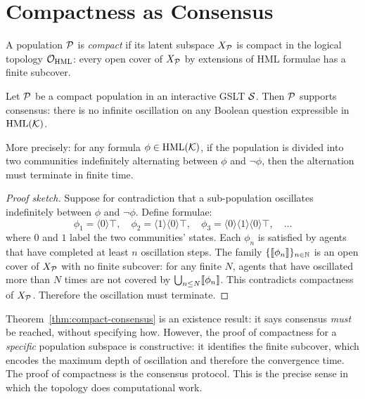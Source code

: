 \section{Compactness as Consensus}

\begin{definition}
A population $\mathcal{P}$ is \emph{compact} if its latent subspace
$X_{\mathcal{P}}$ is compact in the logical topology $\mathcal{O}_{\mathrm{HML}}$:
every open cover of $X_{\mathcal{P}}$ by extensions of HML formulae has a
finite subcover.
\end{definition}

\begin{theorem}
\label{thm:compact-consensus}
Let $\mathcal{P}$ be a compact population in an interactive GSLT $\mathcal{S}$.
Then $\mathcal{P}$ supports consensus: there is no infinite oscillation
on any Boolean question expressible in $\mathrm{HML}(\mathcal{K})$.

More precisely: for any formula $\phi \in \mathrm{HML}(\mathcal{K})$, if the
population is divided into two communities indefinitely alternating
between $\phi$ and $\neg\phi$, then the alternation must terminate
in finite time.
\end{theorem}

\begin{proof}[Proof sketch]
Suppose for contradiction that a sub-population oscillates
indefinitely between $\phi$ and $\neg\phi$.
Define formulae:
\[
  \phi_1 = \langle 0 \rangle\top, \quad
  \phi_2 = \langle 1 \rangle\langle 0 \rangle\top, \quad
  \phi_3 = \langle 0 \rangle\langle 1 \rangle\langle 0 \rangle\top,
  \quad \ldots
\]
where $0$ and $1$ label the two communities' states.
Each $\phi_n$ is satisfied by agents that have completed at least
$n$ oscillation steps.
The family $\{ \llbracket \phi_n \rrbracket \}_{n \in \mathbb{N}}$ is an open cover
of $X_{\mathcal{P}}$ with no finite subcover: for any finite $N$,
agents that have oscillated more than $N$ times are not covered
by $\bigcup_{n \leq N} \llbracket \phi_n \rrbracket$.
This contradicts compactness of $X_{\mathcal{P}}$.
Therefore the oscillation must terminate.
\end{proof}

\begin{remark}
Theorem~\ref{thm:compact-consensus} is an existence result:
it says consensus \emph{must} be reached, without specifying how.
However, the proof of compactness for a \emph{specific} population
subspace is constructive: it identifies the finite subcover, which
encodes the maximum depth of oscillation and therefore the
convergence time.
The proof of compactness is the consensus protocol.
This is the precise sense in which the topology does computational
work.
\end{remark}

